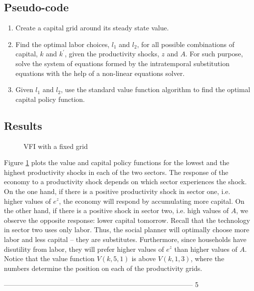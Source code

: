 \documentclass[11pt,a4paper]{article}
\newcommand{\goodgap}{ \hspace{\subfigtopskip} \hspace{\subfigbottomskip}}
\begin{document}
\subsection*{Pseudo-code}
\begin{enumerate}
\item Create a capital grid around its steady state value.
\item Find the optimal labor choices, $l_1$ and $l_2$, for all possible combinations of capital, $k$ and $k^{\prime}$, given the productivity shocks, $z$ and $A$. For such purpose, solve the system of equations formed by the intratemporal substitution equations with the help of a non-linear equations solver.
\item Given $l_1$ and $l_2$, use the standard value function algorithm to find the optimal capital policy function.
\end{enumerate}


\subsection*{Results}

\begin{figure}[h]
\centering
{}
\goodgap
{}
\caption{VFI with a fixed grid}
\label{VFI_fixedGrid}
\end{figure}

Figure \ref{VFI_fixedGrid} plots the value and capital policy functions for the lowest and the highest productivity shocks in each of the two sectors. The response of the economy to a productivity shock depends on which sector experiences the shock. On the one hand, if there is a positive productivity shock in sector one, i.e. higher values of $e^{z}$, the economy will respond by accumulating more capital. On the other hand, if there is a positive shock in sector two, i.e. high values of $A$, we observe the opposite response: lower capital tomorrow. Recall that the technology in sector two uses only labor. Thus, the social planner will optimally choose more labor and less capital -- they are substitutes. Furthermore, since households have disutility from labor, they will prefer higher values of $e^z$ than higher values of $A$. Notice that the value function $V(k,5,1)$ is above $V(k,1,3)$, where the numbers determine the position on each of the productivity grids.

-----------------------------------------------------------------------------------
5
\end{document}
